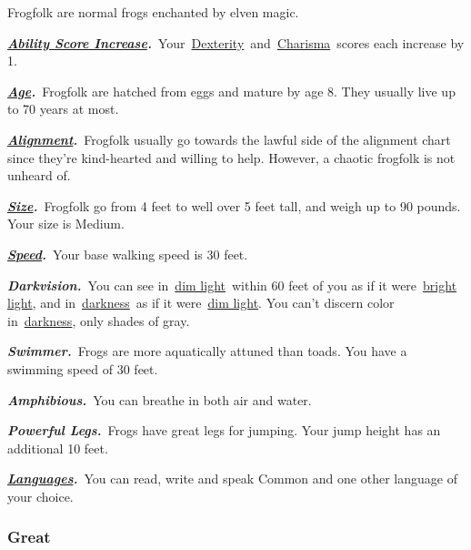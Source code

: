 Frogfolk are normal frogs enchanted by elven magic.

\textbf{\emph{\href{https://www.dandwiki.com/wiki/5e_SRD:About_Races\#Ability_Score_Increase}{Ability
Score
Increase}.}}~Your~\href{https://www.dandwiki.com/wiki/5e_SRD:Dexterity}{Dexterity}~and~\href{https://www.dandwiki.com/wiki/5e_SRD:Charisma}{Charisma}~scores
each increase by 1.

\textbf{\emph{\href{https://www.dandwiki.com/wiki/5e_SRD:About_Races\#Age}{Age}.}}~Frogfolk
are hatched from eggs and mature by age 8. They usually live up to 70
years at most.

\textbf{\emph{\href{https://www.dandwiki.com/wiki/5e_SRD:About_Races\#Alignment}{Alignment}.}}~Frogfolk
usually go towards the lawful side of the alignment chart since they're
kind-hearted and willing to help. However, a chaotic frogfolk is not
unheard of.

\textbf{\emph{\href{https://www.dandwiki.com/wiki/5e_SRD:About_Races\#Size}{Size}.}}~Frogfolk
go from 4 feet to well over 5 feet tall, and weigh up to 90 pounds. Your
size is Medium.

\textbf{\emph{\href{https://www.dandwiki.com/wiki/5e_SRD:About_Races\#Speed}{Speed}.}}~Your
base walking speed is 30 feet.

\textbf{\emph{Darkvision.}}~You can see
in~\href{https://www.dandwiki.com/wiki/5e_SRD:Dim_Light}{dim
light}~within 60 feet of you as if it
were~\href{https://www.dandwiki.com/wiki/5e_SRD:Bright_Light}{bright
light}, and
in~\href{https://www.dandwiki.com/wiki/5e_SRD:Vision_and_Light}{darkness}~as
if it were~\href{https://www.dandwiki.com/wiki/5e_SRD:Dim_Light}{dim
light}. You can't discern color
in~\href{https://www.dandwiki.com/wiki/5e_SRD:Vision_and_Light}{darkness},
only shades of gray.

\textbf{\emph{Swimmer.}}~Frogs are more aquatically attuned than toads.
You have a swimming speed of 30 feet.

\textbf{\emph{Amphibious.}}~You can breathe in both air and water.

\textbf{\emph{Powerful Legs.}}~Frogs have great legs for jumping. Your
jump height has an additional 10 feet.

\textbf{\emph{\href{https://www.dandwiki.com/wiki/5e_SRD:About_Races\#Languages}{Languages}.}}~You
can read, write and speak Common and one other language of your choice.

\subsubsection{\texorpdfstring{\textbf{Great}}{Great}}\label{great}

